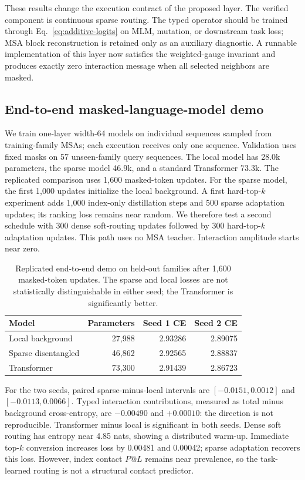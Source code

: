 \documentclass[10pt]{article}
\begin{document}
These results change the execution contract of the proposed layer.  The verified component is
continuous sparse routing.  The typed operator should be trained through Eq.~\ref{eq:additive-logits}
on MLM, mutation, or downstream task loss; MSA block reconstruction is retained only as an
auxiliary diagnostic.  A runnable implementation of this layer now satisfies the weighted-gauge
invariant and produces exactly zero interaction message when all selected neighbors are masked.

\subsection{End-to-end masked-language-model demo}

We train one-layer width-64 models on individual sequences sampled from training-family MSAs;
each execution receives only one sequence.  Validation uses fixed masks on 57 unseen-family
query sequences.  The local model has 28.0k parameters, the sparse model 46.9k, and a standard
Transformer 73.3k.  The replicated comparison uses 1,600 masked-token updates.  For the sparse model, the first
1,000 updates initialize the local background.  A first hard-top-$k$ experiment adds 1,000
index-only distillation steps and 500 sparse adaptation updates; its ranking loss remains near
random.  We therefore test a second schedule with 300 dense soft-routing updates followed by
300 hard-top-$k$ adaptation updates.  This path uses no MSA teacher.  Interaction amplitude
starts near zero.

\begin{table}[t]
\centering
\small
\begin{tabular}{lrrr}
\toprule
Model & Parameters & Seed 1 CE & Seed 2 CE \\
\midrule
Local background & 27,988 & 2.93286 & 2.89075 \\
Sparse disentangled & 46,862 & 2.92565 & 2.88837 \\
Transformer & 73,300 & 2.91439 & 2.86723 \\
\bottomrule
\end{tabular}
\caption{Replicated end-to-end demo on held-out families after 1,600 masked-token updates.
The sparse and local losses are not statistically distinguishable in either seed; the
Transformer is significantly better.}
\label{tab:end-to-end-demo}
\end{table}

For the two seeds, paired sparse-minus-local intervals are $[-0.0151,0.0012]$ and
$[-0.0113,0.0066]$.  Typed interaction contributions, measured as total minus background
cross-entropy, are $-0.00490$ and $+0.00010$: the direction is not reproducible.  Transformer
minus local is significant in both seeds.  Dense soft routing has entropy near 4.85 nats,
showing a distributed warm-up.  Immediate top-$k$ conversion increases loss by 0.00481 and
0.00042; sparse adaptation recovers this loss.  However, index contact $P@L$ remains near
prevalence, so the task-learned routing is not a structural contact predictor.
\end{document}
